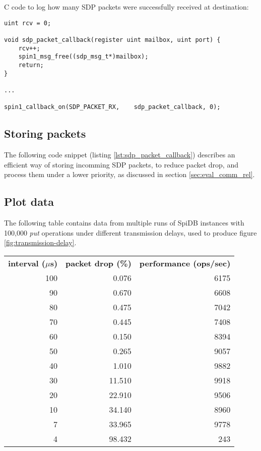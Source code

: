 C code to log how many SDP packets were successfully received at destination:

\begin{lstlisting}[caption={Destination}]
uint rcv = 0;

void sdp_packet_callback(register uint mailbox, uint port) {
    rcv++;
    spin1_msg_free((sdp_msg_t*)mailbox);
    return;
}

...

spin1_callback_on(SDP_PACKET_RX,    sdp_packet_callback, 0);

\end{lstlisting}


\subsection{Storing packets}
The following code snippet (listing \ref{lst:sdp_packet_callback}) describes an efficient way of storing incomming SDP packets, to reduce packet drop, and process them under a lower priority, as discussed in section \ref{sec:eval_comm_rel}.



\clearpage
\newpage

\subsection{Plot data}
The following table contains data from multiple runs of SpiDB instances with 100,000 \textit{put} operations under different transmission delays, used to produce figure \ref{fig:transmission-delay}.

\vspace{5mm}

\begin{tabular}{ r | r | r }
\textbf{interval ($\mu$s)} & \textbf{packet drop (\%)} & \textbf{performance (ops/sec)}  \\
100 & 0.076 	& 6175 \\
90	& 0.670		& 6608 \\
80	& 0.475		& 7042 \\
70	& 0.445		& 7408 \\
60	& 0.150		& 8394 \\
50	& 0.265		& 9057 \\
40	& 1.010		& 9882 \\
30	& 11.510	& 9918 \\
20	& 22.910	& 9506 \\ 
10	& 34.140	& 8960 \\
7	& 33.965 	& 9778 \\
4	& 98.432 	& 243 \\
\end{tabular}

